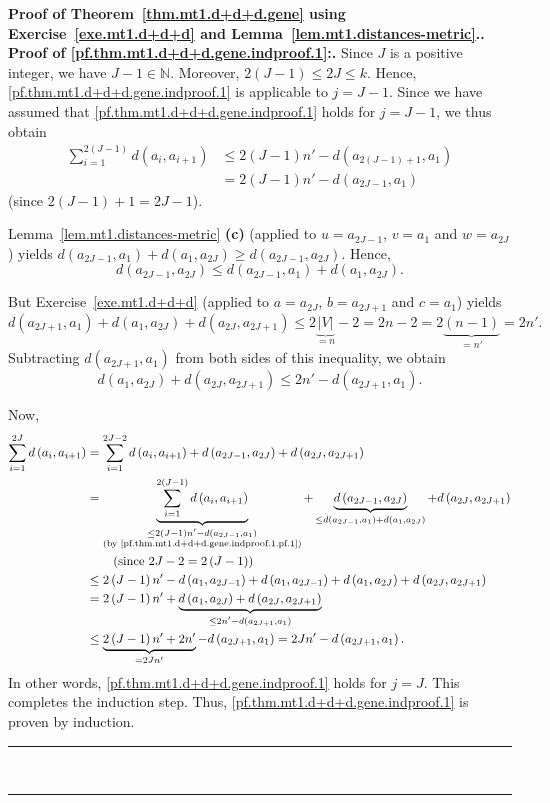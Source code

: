 \documentclass[numbers=enddot,12pt,final,onecolumn,notitlepage]{scrartcl}%
\theoremstyle{definition}
\newenvironment{proof}[1][Proof]{\noindent\textbf{#1.} }{\ \rule{0.5em}{0.5em}}
\let\sumnonlimits\sum
\renewcommand{\sum}{\sumnonlimits\limits}
\newcommand{\NN}{\mathbb{N}}
\newcommand{\abs}[1]{\left| #1 \right|}
\newcommand{\tup}[1]{\left( #1 \right)}
\newcommand{\underbrack}[2]{\underbrace{#1}_{\substack{#2}}}
\begin{document}
\begin{proof}[Proof of Theorem~\ref{thm.mt1.d+d+d.gene} using
Exercise~\ref{exe.mt1.d+d+d} and
Lemma~\ref{lem.mt1.distances-metric}.]
\begin{proof}[Proof of \eqref{pf.thm.mt1.d+d+d.gene.indproof.1}:]
Since $J$ is a positive integer, we have $J-1 \in \NN$. Moreover,
$2 \tup{J-1} \leq 2J \leq k$. Hence,
\eqref{pf.thm.mt1.d+d+d.gene.indproof.1} is applicable to $j = J-1$.
Since we have assumed that \eqref{pf.thm.mt1.d+d+d.gene.indproof.1}
holds for $j = J-1$, we thus obtain
\begin{align}
\sum_{i=1}^{2 \tup{J-1}} d \tup{a_i, a_{i+1}}
&\leq 2\tup{J-1} n' - d \tup{a_{2\tup{J-1}+1}, a_1} \nonumber \\
&= 2\tup{J-1} n' - d \tup{a_{2J-1}, a_1}
\label{pf.thm.mt1.d+d+d.gene.indproof.1.pf.1}
\end{align}
(since $2\tup{J-1}+1 = 2J-1$).

Lemma~\ref{lem.mt1.distances-metric} \textbf{(c)} (applied to
$u = a_{2J-1}$, $v = a_1$ and $w = a_{2J}$) yields
$d \tup{a_{2J-1}, a_1} + d \tup{a_1, a_{2J}}
\geq d \tup{a_{2J-1}, a_{2J}}$.
Hence,
\[
d \tup{a_{2J-1}, a_{2J}}
\leq d \tup{a_{2J-1}, a_1} + d \tup{a_1, a_{2J}} .
\]

But Exercise~\ref{exe.mt1.d+d+d} (applied to $a = a_{2J}$,
$b = a_{2J+1}$ and $c = a_1$) yields
\[
d \tup{a_{2J+1}, a_1} + d \tup{a_1, a_{2J}} + d \tup{a_{2J}, a_{2J+1}}
\leq 2 \underbrace{\abs{V}}_{= n} - 2 = 2 n - 2
= 2 \underbrace{\tup{n-1}}_{= n'} = 2 n' .
\]
Subtracting $d \tup{a_{2J+1}, a_1}$ from both sides of this
inequality, we obtain
\[
d \tup{a_1, a_{2J}} + d \tup{a_{2J}, a_{2J+1}}
\leq 2 n' - d \tup{a_{2J+1}, a_1} .
\]

Now,
\begin{align*}
\sum_{i=1}^{2J} d \tup{a_i, a_{i+1}}
&= \sum_{i=1}^{2J-2} d \tup{a_i, a_{i+1}}
        + d \tup{a_{2J-1}, a_{2J}} + d \tup{a_{2J}, a_{2J+1}} \\
&= \underbrack{\sum_{i=1}^{2 \tup{J-1}} d \tup{a_i, a_{i+1}}}
              {\leq 2\tup{J-1} n' - d \tup{a_{2J-1}, a_1} \\
               \text{(by \eqref{pf.thm.mt1.d+d+d.gene.indproof.1.pf.1})}}
        + \underbrack{d \tup{a_{2J-1}, a_{2J}}}
                     {\leq d \tup{a_{2J-1}, a_1} + d \tup{a_1, a_{2J}}}
        + d \tup{a_{2J}, a_{2J+1}} \\
&\qquad \left(\text{since } 2J-2 = 2 \tup{J-1} \right) \\
&\leq 2\tup{J-1} n' - d \tup{a_1, a_{2J-1}}
        + d \tup{a_1, a_{2J-1}} + d \tup{a_1, a_{2J}}
        + d \tup{a_{2J}, a_{2J+1}} \\
&= 2\tup{J-1} n'
        + \underbrack{d \tup{a_1, a_{2J}} + d \tup{a_{2J}, a_{2J+1}}}
                     {\leq 2 n' - d \tup{a_{2J+1}, a_1} } \\
&\leq \underbrace{2\tup{J-1} n' + 2n'}_{= 2J n'}
      - d \tup{a_{2J+1}, a_1}
 = 2J n' - d \tup{a_{2J+1}, a_1} .
\end{align*}
In other words, \eqref{pf.thm.mt1.d+d+d.gene.indproof.1} holds
for $j = J$.
This completes the induction step.
Thus, \eqref{pf.thm.mt1.d+d+d.gene.indproof.1} is proven by induction.
\end{proof}


\end{proof}
\end{document}
